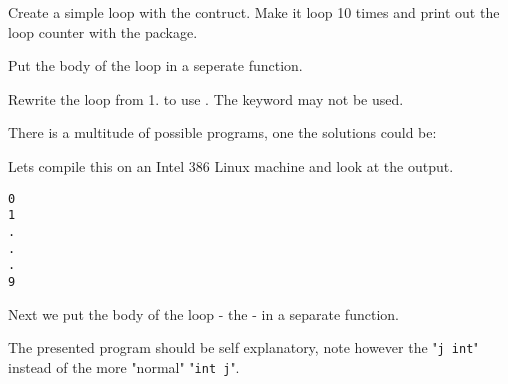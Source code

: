 \begin{Exercise}[title={For-loop},difficulty=1]
\label{ex:for-loop}
\Question \label{ex:for-loop q1} Create a simple loop with the  contruct. Make it loop
10 times and print out the loop counter with the  package.

\Question \label{ex:for-loop q2} Put the body of the loop in a seperate function.

\Question \label{ex:for-loop q3} Rewrite the loop from 1. to use . The
keyword  may not be used.
\end{Exercise}

\begin{Answer}

\Question There is a multitude of possible programs, 
one the solutions could be:

Lets compile this on an Intel 386 Linux machine and look at the
output.
\begin{alltt}
% 8g for.go && 8l -o for for.8
% ./for
0
1
.
.
.
9
\end{alltt}

\Question Next we put the body of the 
loop - the  - in a separate function.

The presented program should be self explanatory, note however the
"\lstinline{j int}" instead of the more "normal" "\lstinline{int j}".

\end{Answer}

